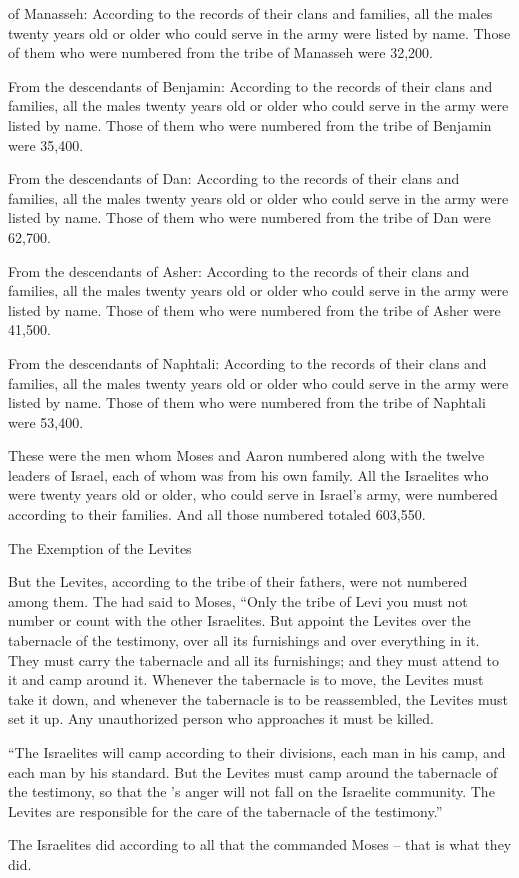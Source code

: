 {of Manasseh: According to the records
of their clans
and families,
all
the males
twenty
years
old or older
who could serve
in the army
were listed
by name.
Those of them who were numbered
from the tribe
of Manasseh
were 32,200.
\par }{\PP {}From the descendants
of Benjamin: According to the records
of their clans
and families,
all
the males
twenty
years
old or older
who could serve
in the army
were listed
by name.
Those of them who were numbered
from the tribe
of Benjamin
were 35,400.
\par }{\PP {}From the descendants
of Dan: According to the records
of their clans
and families,
all
the males
twenty
years
old or older
who could serve
in the army
were listed
by name.
Those of them who were numbered
from the tribe
of Dan
were 62,700.
\par }{\PP {}From the descendants
of Asher: According to the records
of their clans
and families,
all
the males
twenty
years
old or older
who could serve
in the army
were listed
by name.
Those of them who were numbered
from the tribe
of Asher
were 41,500.
\par }{\PP {}From the descendants
of Naphtali: According to the records
of their clans
and families,
all
the males
twenty
years
old or older
who could serve
in the army
were listed
by name.
Those of them who were numbered
from the tribe
of Naphtali
were 53,400.
\par }{\PP {}These
were the men
whom
Moses
and Aaron
numbered
along with the twelve
leaders
of Israel,
each
of whom was
from his own family.
All
the Israelites
who were twenty
years
old or older,
who could serve
in Israel’s
army,
were numbered
according to their families.
And all
those numbered
totaled 603,550.
\par }{\SH The Exemption of the Levites
\par }{\PP {}But the Levites,
according to the tribe
of their fathers,
were not
numbered
among them.
The
{}
had said
to
Moses,
“Only
the tribe
of Levi
you must not
number
or
count
with the other
Israelites.
But appoint
the
Levites
over
the tabernacle
of the testimony,
over
all
its furnishings
and over
everything
in it.
They
must carry
the
tabernacle
and all
its furnishings;
and they
must attend
to it and camp
around
it.
Whenever the tabernacle
is to move,
the Levites
must take it down,
and whenever the tabernacle
is to be reassembled,
the Levites
must set it up.
Any unauthorized person
who approaches
it must be killed.
\par }{\PP {}“The Israelites
will camp
according to their divisions,
each man
in his camp,
and each man
by his standard.
But the Levites
must camp
around
the tabernacle
of the testimony,
so that the
{}’s anger
will not
fall on
the Israelite
community.
The Levites
are responsible
for the care
of the tabernacle
of the testimony.”
\par }{\PP {}The Israelites
did
according to all
that
the {}
commanded
Moses –
that is what
they did.

}
